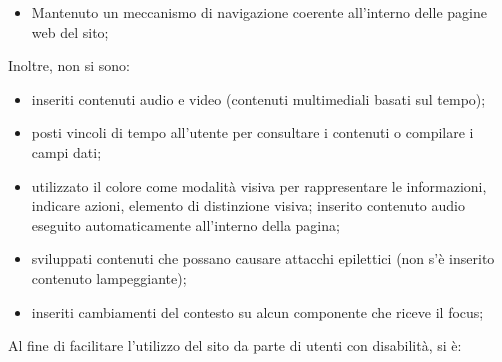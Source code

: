 {{\begin{itemize}
\begin{itemize}
			\item alternative testuali per il contenuto non testuale:
				\begin{itemize} \itemsep0.5pt
					\item corredata ogni immagine con gli attributi alt e title che la descrivono;
					\item aggiunta di una label ad ogni campo di input della form, in aiuto dello screen reader;
				\end{itemize}
			\item intestazioni ed etichette appropriate; 
			\item l'indicatore del focus nelle interfacce utilizzabili da tastiera; 
			\item sezioni per organizzare il testo.
			\item la lingua predefinita per il contenuto delle pagine; forniti i significati delle abbreviazioni e degli acronimi utilizzati; usati gli attributi \texttt{xml:lang} per definire parole o blocchi in lingua diversa da quella predefinita della pagina;
 			\item Definiti i meta tag: \textit{Description, Keywords, Copyright, Author}
 			\item Un link di ritorno ad inizio pagina.
		\end{itemize} 
		\item Mantenuto un meccanismo di navigazione coerente all'interno delle pagine web del sito;
	\end{itemize}
	Inoltre, non si sono:
	\begin{itemize}\itemsep1pt
		\item inseriti contenuti audio e video (contenuti multimediali basati sul tempo);
		\item posti vincoli di tempo all'utente per consultare i contenuti o compilare i campi dati;
		\item utilizzato il colore come modalità visiva per rappresentare le informazioni, indicare azioni, elemento di distinzione visiva; inserito contenuto audio eseguito automaticamente all'interno della pagina;
		\item sviluppati contenuti che possano causare attacchi epilettici (non s'è inserito contenuto lampeggiante);
		\item inseriti cambiamenti del contesto su alcun componente che riceve il focus;
	\end{itemize}
		Al fine di facilitare l'utilizzo del sito da parte di utenti con disabilità, si è:
		\begin{itemize}\itemsep1pt


\end{itemize}}}
